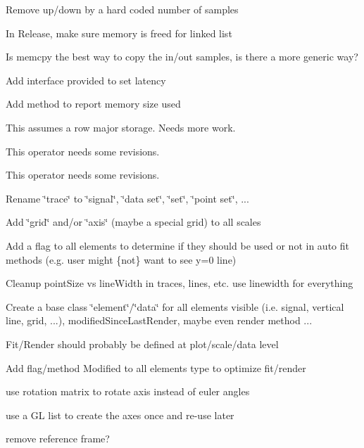 \begin{DoxyRefList}
Remove up/down by a hard coded number of samples 

In Release, make sure memory is freed for linked list 

Is memcpy the best way to copy the in/out samples, is there a more generic way? 

Add interface provided to set latency 

Add method to report memory size used  
\item[\label{todo__todo000002}%
\hypertarget{todo__todo000002}{}%
Member \hyperlink{classvct_dynamic_matrix_ac0062998c00df7a4e5155c3eac8fddb0}{vct\-Dynamic\-Matrix$<$ \-\_\-element\-Type $>$\-:\-:operator=} (const vct\-Dynamic\-Const\-Matrix\-Base$<$ \-\_\-\-\_\-matrix\-Owner\-Type, \-\_\-\-\_\-element\-Type $>$ \&other\-Matrix)]This assumes a row major storage. Needs more work.  
\item[\label{todo__todo000003}%
\hypertarget{todo__todo000003}{}%
Member \hyperlink{classvct_dynamic_matrix_a8c20bdf6d0df4b4271cb970dd8f225bd}{vct\-Dynamic\-Matrix$<$ \-\_\-element\-Type $>$\-:\-:operator=} (const vct\-Return\-Dynamic\-Matrix$<$ value\-\_\-type $>$ \&other\-Matrix)]This operator needs some revisions.  
\item[\label{todo__todo000004}%
\hypertarget{todo__todo000004}{}%
Member \hyperlink{classvct_dynamic_n_array_a46790594f24b17dd1f5c808210cf36c8}{vct\-Dynamic\-N\-Array$<$ \-\_\-element\-Type, \-\_\-dimension $>$\-:\-:operator=} (const vct\-Return\-Dynamic\-N\-Array$<$ value\-\_\-type, \-\_\-dimension $>$ \&other\-N\-Array)]This operator needs some revisions.  
\item[\label{todo__todo000005}%
\hypertarget{todo__todo000005}{}%
Class \hyperlink{classvct_plot2_d_base}{vct\-Plot2\-D\-Base} ]Rename \char`\"{}trace\char`\"{} to \char`\"{}signal\char`\"{}, \char`\"{}data set\char`\"{}, \char`\"{}set\char`\"{}, \char`\"{}point set\char`\"{}, ... 

Add \char`\"{}grid\char`\"{} and/or \char`\"{}axis\char`\"{} (maybe a special grid) to all scales 

Add a flag to all elements to determine if they should be used or not in auto fit methods (e.\-g. user might \{not\} want to see y=0 line) 

Cleanup point\-Size vs line\-Width in traces, lines, etc. use linewidth for everything 

Create a base class \char`\"{}element\char`\"{}/\char`\"{}data\char`\"{} for all elements visible (i.\-e. signal, vertical line, grid, ...), modified\-Since\-Last\-Render, maybe even render method ... 

Fit/\-Render should probably be defined at plot/scale/data level 

Add flag/method Modified to all elements type to optimize fit/render  
\item[\label{todo__todo000006}%
\hypertarget{todo__todo000006}{}%
Class \hyperlink{classvct_qt_widget_rotation_open_g_l}{vct\-Qt\-Widget\-Rotation\-Open\-G\-L} ]use rotation matrix to rotate axis instead of euler angles 

use a G\-L list to create the axes once and re-\/use later 

remove reference frame? 
\end{DoxyRefList}